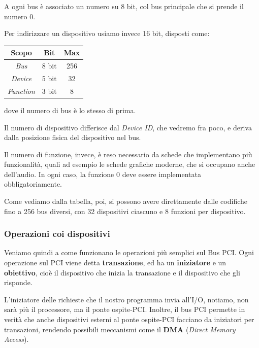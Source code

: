 \documentclass[a4paper,11pt]{article}
\begin{document}
A ogni bus è associato un numero su 8 bit, col bus principale che si prende il numero 0.

Per indirizzare un dispositivo usiamo invece 16 bit, disposti come:
\begin{table}[H]
	\center 
	\begin{tabular} { c | c c }
		\bfseries Scopo & \bfseries Bit & \bfseries Max \\
		\hline 
		\textit{Bus} & 8 bit & 256 \\
		\textit{Device} & 5 bit & 32\\
		\textit{Function} & 3 bit & 8
	\end{tabular}
\end{table}
dove il numero di bus è lo stesso di prima.

Il numero di dispositivo differisce dal \textit{Device ID}, che vedremo fra poco, e deriva dalla posizione fisica del dispositivo nel bus.

Il numero di funzione, invece, è reso necessario da schede che implementano più funzionalità, quali ad esempio le schede grafiche moderne, che si occupano anche dell'audio.
In ogni caso, la funzione 0 deve essere implementata obbligatoriamente.

Come vediamo dalla tabella, poi, si possono avere direttamente dalle codifiche fino a 256 bus diversi, con 32 dispositivi ciascuno e 8 funzioni per dispositivo.

\subsubsection{Operazioni coi dispositivi}
Veniamo quindi a come funzionano le operazioni più semplici sul Bus PCI.
Ogni operazione sul PCI viene detta \textbf{transazione}, ed ha un \textbf{iniziatore} e un \textbf{obiettivo}, cioè il dispositivo che inizia la transazione e il dispositivo che gli risponde.

L'iniziatore delle richieste che il nostro programma invia all'I/O, notiamo, non sarà più il processore, ma il ponte ospite-PCI.
Inoltre, il bus PCI permette in verità che anche dispositivi esterni al ponte ospite-PCI facciano da iniziatori per transazioni, rendendo possibili meccanismi come il \textbf{DMA} (\textit{Direct Memory Access}). 
\end{document}

